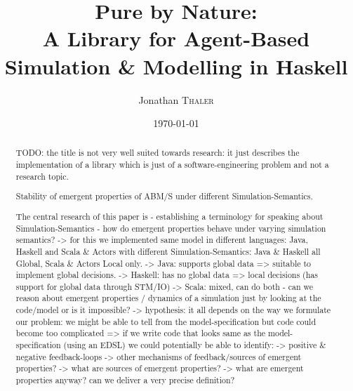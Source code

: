 \documentclass{article}
\title{Pure by Nature:\\A Library for Agent-Based Simulation \& Modelling in Haskell} %
\author{Jonathan \textsc{Thaler}} %
\date{\today} %
\begin{document}
\maketitle %

\begin{abstract}
TODO: the title is not very well suited towards research: it just describes the implementation of a library which is just of a software-engineering problem and not a research topic.

Stability of emergent properties of ABM/S under different Simulation-Semantics.

The central research of this paper is
- establishing a terminology for speaking about Simulation-Semantics
- how do emergent properties behave under varying simulation semantics?
	-> for this we implemented same model in different languages: Java, Haskell and Scala & Actors with different Simulation-Semantics: Java & Haskell all Global, Scala & Actors Local only.
	-> Java: supports global data => suitable to implement global decisions.
	-> Haskell: has no global data => local decisions (has support for global data through STM/IO)
	-> Scala: mixed, can do both 
- can we reason about emergent properties / dynamics of a simulation just by looking at the code/model or is it impossible?
	-> hypothesis: it all depends on the way we formulate our problem: we might be able to tell from the model-specification but code could become too complicated
		=> if we write code that looks same as the model-specification (using an EDSL) we could potentially be able to identify:
			-> positive & negative feedback-loops 
			-> other mechanisms of feedback/sources of emergent properties?
				-> what are sources of emergent properties?
					-> what are emergent properties anyway? can we deliver a very precise definition?


\end{abstract}
\end{document}
